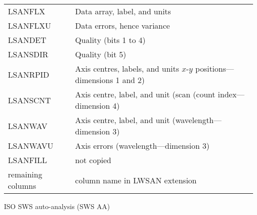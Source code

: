 {{{{            \begin{tabular}{ll}
               LSANFLX            &   Data array, label, and units \\
               LSANFLXU           &   Data errors, hence variance \\
               LSANDET            &   Quality (bits 1 to 4) \\
               LSANSDIR           &   Quality (bit 5) \\
               LSANRPID           &   Axis centres, labels, and units
                                      $x$-$y$ positions---dimensions 1 and 2) \\
               LSANSCNT           &   Axis centre, label, and unit (scan
                                      (count index---dimension 4) \\
               LSANWAV            &   Axis centre, label, and unit
                                      (wavelength---dimension 3) \\
               LSANWAVU           &   Axis errors (wavelength---dimension 3) \\
               LSANFILL           &   not copied \\
               remaining columns  &   column name in LWSAN extension \\
            \end{tabular}
         }
         \bigskip

         \sstitem
         ISO SWS auto-analysis (SWS AA)

         \bigskip

}}}
